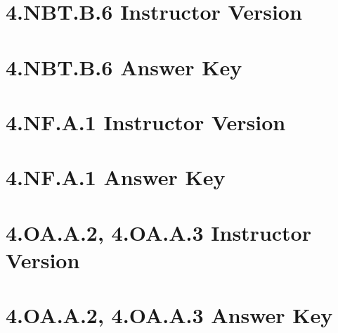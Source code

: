 \documentclass[a4paper,12pt]{article}
\begin{document}
\newpage
\section{4.NBT.B.6 Instructor Version}


\newpage
\section{4.NBT.B.6 Answer Key}


\newpage
\section{4.NF.A.1 Instructor Version}


\newpage
\section{4.NF.A.1 Answer Key}


\newpage
\section{4.OA.A.2, 4.OA.A.3 Instructor Version}


\newpage
\section{4.OA.A.2, 4.OA.A.3 Answer Key}

\end{document}
